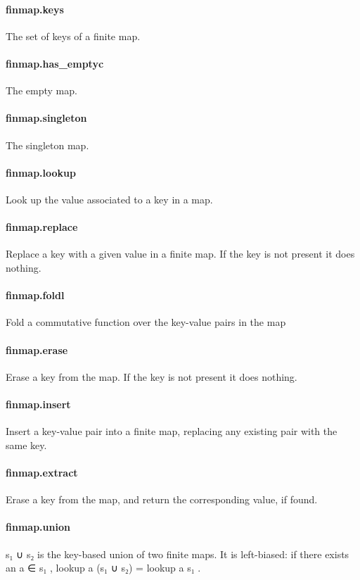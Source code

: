 \documentclass{article}
\begin{document}
\paragraph{finmap.keys}
\par
The set of keys of a finite map.
\paragraph{finmap.has\_emptyc}
\par
The empty map.
\paragraph{finmap.singleton}
\par
The singleton map.
\paragraph{finmap.lookup}
\par
Look up the value associated to a key in a map.
\paragraph{finmap.replace}
\par
Replace a key with a given value in a finite map.
If the key is not present it does nothing.
\paragraph{finmap.foldl}
\par
Fold a commutative function over the key-value pairs in the map
\paragraph{finmap.erase}
\par
Erase a key from the map. If the key is not present it does nothing.
\paragraph{finmap.insert}
\par
Insert a key-value pair into a finite map, replacing any existing pair with
the same key.
\paragraph{finmap.extract}
\par
Erase a key from the map, and return the corresponding value, if found.
\paragraph{finmap.union}
\par
\colorbox[RGB]{253,246,227}{{{{\color[RGB]{101, 123, 131} s₁ ∪ s₂ }}}} is the key-based union of two finite maps. It is left-biased: if
there exists an 
\colorbox[RGB]{253,246,227}{{{{\color[RGB]{101, 123, 131} a ∈ s₁ }}}}, 
\colorbox[RGB]{253,246,227}{{{{\color[RGB]{101, 123, 131} lookup a (s₁ ∪ s₂)  }}}{{{\color[RGB]{181, 137, 0} = }}}{{{\color[RGB]{101, 123, 131}  lookup a s₁ }}}}.
\end{document}
